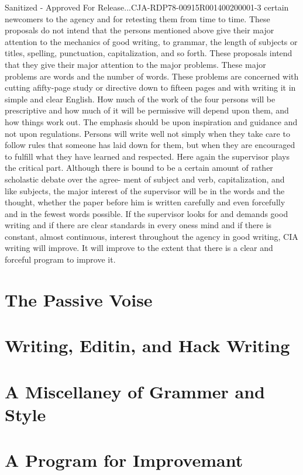 \documentclass[
    oneside,
    11pt,
    draft
]{memoir}
\begin{document}
Sanitized - Approved For Release...CJA-RDP78-00915R001400200001-3 certain newcomers to the agency and for retesting them from time to time. These proposals do not intend that the persons mentioned above give their major attention to the mechanics of good writing, to grammar, the length of subjects or titles, spelling, punctuation, capitalization, and so forth. These proposals intend that they give their major attention to the major problems. These major problems are words and the number of words. These problems are concerned with cutting afifty-page study or directive down to fifteen pages and with writing it in simple and clear English. How much of the work of the four persons will be prescriptive and how much of it will be permissive will depend upon them, and how things work out. The emphasis should be upon inspiration and guidance and not upon regulations. Persons will write well not simply when they take care to follow rules that someone has laid down for them, but when they are encouraged to fulfill what they have learned and respected. Here again the supervisor plays the critical part. Although there is bound to be a certain amount of rather scholastic debate over the agree- ment of subject and verb, capitalization, and like subjects, the major interest of the supervisor will be in the words and the thought, whether the paper before him is written carefully and even forcefully and in the fewest words possible. If the supervisor looks for and demands good writing and if there are clear standards in every oness mind and if there is constant, almost continuous, interest throughout the agency in good writing, CIA writing will improve. It will improve to the extent that there is a clear and forceful program to improve it.

\chapter{The Passive Voise}
\chapter{Writing, Editin, and Hack Writing}
\chapter{A Miscellaney of Grammer and Style}
\chapter{A Program for Improvemant}
\end{document}
